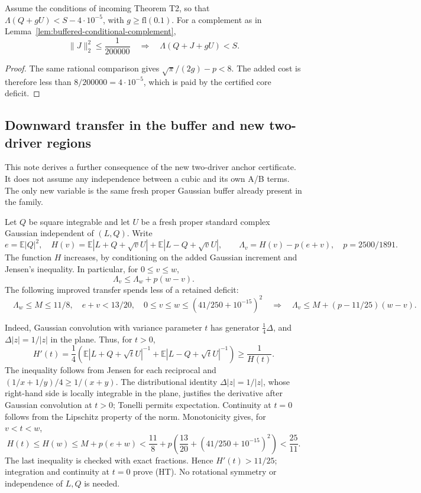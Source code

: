 \begin{corollary}
Assume the conditions of incoming Theorem T2, so that
\(\Lambda(Q+gU)<S-4\cdot10^{-5}\), with \(g\ge\mathrm{fl}(0.1)\).
For a complement as in Lemma~\ref{lem:buffered-conditional-complement},
\[
 \|J\|_2^2\le\frac1{200000}
 \quad\Longrightarrow\quad \Lambda(Q+J+gU)<S.
\]
\end{corollary}
\begin{proof}
The same rational comparison gives
\(\sqrt\pi/(2g)-p<8\).
The added cost is therefore less than
\(8/200000=4\cdot10^{-5}\), which is paid by the certified core
deficit.
\end{proof}

\subsection{Downward transfer in the buffer and new two-driver regions}\label{sec:tdb-downward}

This note derives a further consequence of the new two-driver anchor
certificate. It does not assume any independence between a cubic and its
own A/B terms. The only new variable is the same fresh proper Gaussian
buffer already present in the family.

Let \(Q\) be square integrable and let \(U\) be a fresh proper standard
complex Gaussian independent of \((L,Q)\). Write
\[
 e=\mathbb E|Q|^2,\quad
 H(v)=\mathbb E|L+Q+\sqrt vU|
      +\mathbb E|L-Q+\sqrt vU|,\qquad
 \Lambda_v=H(v)-p(e+v),\quad p=2500/1891.
\]
The function \(H\) increases, by conditioning on the added Gaussian
increment and Jensen's inequality. In particular, for \(0\le v\le w\),
\[
 \Lambda_v\le\Lambda_w+p(w-v).
\]
The following improved transfer spends less of a retained deficit:
\[
 \boxed{\quad
 \Lambda_w\le M\le11/8,\quad
 e+v<13/20,\quad
 0\le v\le w\le(41/250+10^{-15})^2
 \quad\Longrightarrow\quad
 \Lambda_v\le M+(p-11/25)(w-v).
 \quad}                                                     \tag{HT}
\]

Indeed, Gaussian convolution with variance parameter \(t\) has generator
\(\tfrac14\Delta\), and \(\Delta|z|=1/|z|\) in the plane. Thus, for \(t>0\),
\[
 H'(t)=\frac14\left(
  \mathbb E|L+Q+\sqrt tU|^{-1}
 +\mathbb E|L-Q+\sqrt tU|^{-1}\right)\ge\frac1{H(t)}.
\]
The inequality follows from Jensen for each reciprocal and
\((1/x+1/y)/4\ge1/(x+y)\).
The distributional identity \(\Delta|z|=1/|z|\), whose right-hand
side is locally integrable in the plane, justifies the derivative
after Gaussian convolution at \(t>0\); Tonelli permits expectation.
Continuity at \(t=0\) follows from the Lipschitz property of the norm.
Monotonicity gives, for \(v<t<w\),
\[
 H(t)\le H(w)\le M+p(e+w)
 < \frac{11}8+p\left(\frac{13}{20}
              +(41/250+10^{-15})^2\right)<\frac{25}{11}.
\]
The last inequality is checked with exact fractions. Hence
\(H'(t)>11/25\); integration and continuity at \(t=0\) prove (HT).
No rotational symmetry or independence of \(L,Q\) is needed.

